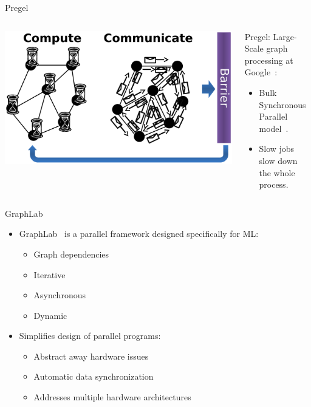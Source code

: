 \documentclass[onlymath,xcolor=pdftex,dvipsnames,table]{beamer}
\theoremstyle{remark} %
\begin{document}
\begin{frame}{Pregel}
\begin{columns}
  \begin{column}{.5\textwidth}
    \includegraphics[width=\columnwidth]{bsp.pdf}
  \end{column}
  \begin{column}{.5\textwidth}
    Pregel: Large-Scale graph processing at Google~\cite{malewicz2010pregel}\footnotemark:
    \begin{itemize}
      \item Bulk Synchronous Parallel model~\cite{valiant1990bridging}.
      \item Slow jobs slow down the whole process.
    \end{itemize}
  \end{column}
\end{columns}
\end{frame}

\begin{frame}{GraphLab}
\begin{itemize}\itemsep10pt
\item GraphLab~\cite{low2010graphlab,low2012distributed} is a parallel framework designed specifically for ML:
  \begin{itemize}
    \item Graph dependencies
    \item Iterative
    \item Asynchronous
    \item Dynamic
  \end{itemize}
\item Simplifies design of parallel programs:
  \begin{itemize}
    \item Abstract away hardware issues
    \item Automatic data synchronization
    \item Addresses multiple hardware architectures
  \end{itemize}
\end{itemize}
\end{frame}
\end{document}
